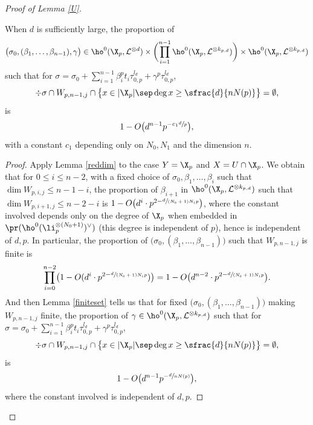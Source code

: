 \begin{proof}[Proof of Lemma \ref{U}]
\begin{lem}\label{5.8}
When $d$ is sufficiently large, the proportion of
\[
\big(\sigma_0, (\beta_1,\dots, \beta_{n-1}), \gamma\big) \in \ho^0(\X_p,\mathcal{L}^{\otimes d})\times \biggl(\prod_{i=1}^{n-1} \ho^0(\X_p,\mathcal{L}^{\otimes k_{p,d}}) \biggr) \times \ho^0(\X_p, \mathcal{L}^{\otimes k_{p,d}})
\]
such that for $\sigma=\sigma_{0}+\sum_{i=1}^{n-1} \beta_i^pt_i\tau_{0,p}^{l_d}+\gamma^p\tau_{0,p}^{l_d}$,
\[
\div \sigma\cap W_{p,n-1,j}\cap \bigl\{ x\in |\X_p|\sep \deg x\geq\sfrac{d}{nN(p)} \bigr\}=\emptyset,
\]
is
\[
1-O\bigl(d^{n-1}p^{-c_1\sfrac{d}{p}} \bigr),
\]
with a constant $c_1$ depending only on $N_0,N_1$ and the dimension $n$.
\end{lem}
\begin{proof}[Proof]
Apply Lemma \ref{reddim} to the case $Y=\X_p$ and $X=U\cap \X_p$. We obtain that for $0\leq i\leq n-2$, with a fixed choice of $\sigma_0,\beta_1,\dots, \beta_i$ such that $\dim W_{p,i,j}\leq n-1-i$, the proportion of $\beta_{i+1}$ in $\ho^0(\X_p,\mathcal{L}^{\otimes k_{p,d}})$ such that $\dim W_{p,i+1,j} \leq n-2-i$ is $1-O\big(d^i\cdot p^{2-\sfrac{d}{(N_0+1)N_1p}}\big)$, where the constant involved depends only on the degree of $\X_p$ when embedded in $\pr(\ho^0(\li_p^{\otimes(N_0+1)})^{\vee})$ (this degree is independent of $p$), hence is independent of $d,p$.
In particular, the proportion of $\big(\sigma_0,(\beta_1,\dots, \beta_{n-1})\big)$ such that $W_{p,n-1,j}$ is finite is
\[
\prod_{i=0}^{n-2}\bigl(1-O(d^i\cdot p^{2-\sfrac{d}{(N_0+1)N_1p}}) \bigr)=1-O\bigl(d^{n-2}\cdot p^{2-\sfrac{d}{(N_0+1)N_1p}}\bigr).
\]
And then Lemma \ref{finiteset} tells us that for fixed $\big(\sigma_0,(\beta_1,\dots, \beta_{n-1})\big)$ making $W_{p,n-1,j}$ finite, the proportion of $\gamma\in \ho^0(\X_p,\mathcal{L}^{\otimes k_{p,d}})$ such that for $\sigma=\sigma_{0}+\sum_{i=1}^{n-1} \beta_i^pt_i\tau_{0,p}^{l_d}+\gamma^p\tau_{0,p}^{l_d}$,
\[
\div \sigma\cap W_{p,n-1,j}\cap \bigl\{ x\in |\X_p|\sep \deg x\geq\sfrac{d}{nN(p)} \bigr\}=\emptyset,
\]
is
\[
1-O\bigl(d^{n-1}p^{-\sfrac{d}{nN(p)}}\bigr),
\]
where the constant involved is independent of $d,p$.


\end{proof}
\end{proof}
